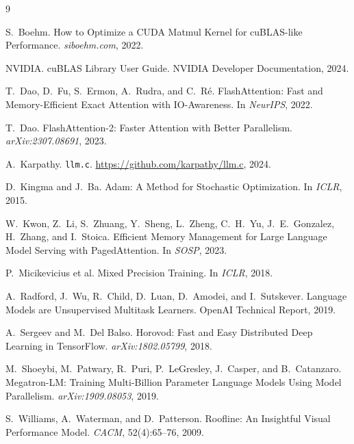 \documentclass[11pt,letterpaper]{article}
\begin{document}
\begin{thebibliography}{9}

S.\ Boehm.
How to Optimize a CUDA Matmul Kernel for cuBLAS-like Performance.
\textit{siboehm.com}, 2022.

NVIDIA. cuBLAS Library User Guide. NVIDIA Developer Documentation, 2024.

T.\ Dao, D.\ Fu, S.\ Ermon, A.\ Rudra, and C.\ R\'{e}.
FlashAttention: Fast and Memory-Efficient Exact Attention with IO-Awareness.
In \textit{NeurIPS}, 2022.

T.\ Dao.
FlashAttention-2: Faster Attention with Better Parallelism.
\textit{arXiv:2307.08691}, 2023.

A.\ Karpathy. \texttt{llm.c}.
\url{https://github.com/karpathy/llm.c}, 2024.

D.\ Kingma and J.\ Ba.
Adam: A Method for Stochastic Optimization.
In \textit{ICLR}, 2015.

W.\ Kwon, Z.\ Li, S.\ Zhuang, Y.\ Sheng, L.\ Zheng, C.\ H.\ Yu,
J.\ E.\ Gonzalez, H.\ Zhang, and I.\ Stoica.
Efficient Memory Management for Large Language Model Serving with
PagedAttention. In \textit{SOSP}, 2023.

P.\ Micikevicius et al.
Mixed Precision Training. In \textit{ICLR}, 2018.

A.\ Radford, J.\ Wu, R.\ Child, D.\ Luan, D.\ Amodei, and I.\ Sutskever.
Language Models are Unsupervised Multitask Learners.
OpenAI Technical Report, 2019.

A.\ Sergeev and M.\ Del Balso.
Horovod: Fast and Easy Distributed Deep Learning in TensorFlow.
\textit{arXiv:1802.05799}, 2018.

M.\ Shoeybi, M.\ Patwary, R.\ Puri, P.\ LeGresley, J.\ Casper, and B.\ Catanzaro.
Megatron-LM: Training Multi-Billion Parameter Language Models Using
Model Parallelism. \textit{arXiv:1909.08053}, 2019.

S.\ Williams, A.\ Waterman, and D.\ Patterson.
Roofline: An Insightful Visual Performance Model.
\textit{CACM}, 52(4):65--76, 2009.

\end{thebibliography}

\appendix
\newpage
\end{document}
